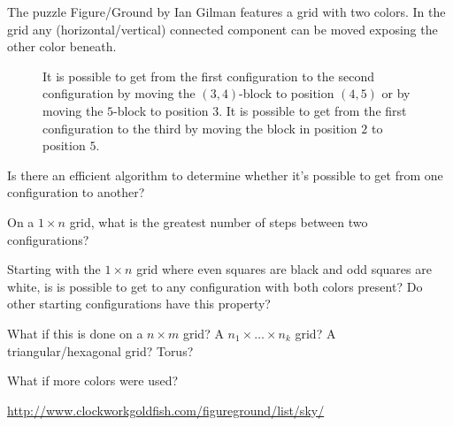 \documentclass{article}
\begin{document}
The puzzle Figure/Ground by Ian Gilman features a grid with two colors. In the
grid any (horizontal/vertical) connected component can be moved exposing the
other color beneath.
\begin{figure}[ht!]
  \centering
  \caption{
    It is possible to get from the first configuration to the second
    configuration by moving the $(3,4)$-block to position $(4,5)$ or by moving
    the $5$-block to position $3$.
    It is possible to get from the first configuration to the third by moving
    the block in position $2$ to position $5$.
  }
\end{figure}

\begin{question}
  Is there an efficient algorithm to determine whether it's possible to get from
  one configuration to another?
\end{question}

\begin{related}
  \item On a $1 \times n$ grid, what is the greatest number of steps between two
  configurations?
  \item Starting with the $1 \times n$ grid where even squares are black and
  odd squares are white, is is possible to get to any configuration with both
  colors present? Do other starting configurations have this property?
  \item What if this is done on a $n \times m$ grid?
  A $n_1 \times \hdots \times n_k$ grid?
  A triangular/hexagonal grid? Torus?
  \item What if more colors were used?
\end{related}


\begin{references}
  \item \url{http://www.clockworkgoldfish.com/figureground/list/sky/}
\end{references}
\end{document}
